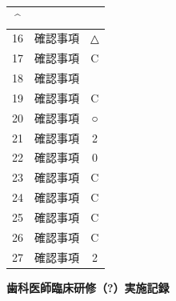 \documentclass[UTF8,10pt,a4paper,fontset=fandol]{ctexart}
\newcommand{\fieldvalue}[1]{#1}
\newcommand{\handwritten}[1]{#1}
\begin{document}
\begin{tabularx}{\textwidth}{|c|X|c|}
\fieldvalue{\handwritten{\textasciicircum}} \\
\hline
16 & 確認事項 & 
\fieldvalue{\handwritten{△}} \\
\hline
17 & 確認事項 & 
\fieldvalue{\handwritten{C}} \\
\hline
18 & 確認事項 & 
\fieldvalue{\handwritten{\checkmark}} \\
\hline
19 & 確認事項 & 
\fieldvalue{\handwritten{C}} \\
\hline
20 & 確認事項 & 
\fieldvalue{\handwritten{○}} \\
\hline
21 & 確認事項 & 
\fieldvalue{\handwritten{2}} \\
\hline
22 & 確認事項 & 
\fieldvalue{\handwritten{0}} \\
\hline
23 & 確認事項 & 
\fieldvalue{\handwritten{C}} \\
\hline
24 & 確認事項 & 
\fieldvalue{\handwritten{C}} \\
\hline
25 & 確認事項 & 
\fieldvalue{\handwritten{C}} \\
\hline
26 & 確認事項 & 
\fieldvalue{\handwritten{C}} \\
\hline
27 & 確認事項 & 
\fieldvalue{\handwritten{2}} \\
\hline
\end{tabularx}
\normalsize


\newpage

\begin{center}
\textbf{歯科医師臨床研修（?）実施記録}\\
\end{center}
\end{document}
